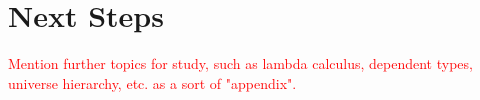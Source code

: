 \documentclass[12pt]{article}
\theoremstyle{definition}
\theoremstyle{remark}
\begin{document}
\section{Next Steps}

\textcolor{red}{Mention further topics for study, such as lambda calculus, dependent types, universe hierarchy, etc. as a sort of "appendix".}


\nocite{*}

\printbibliography
\end{document}
